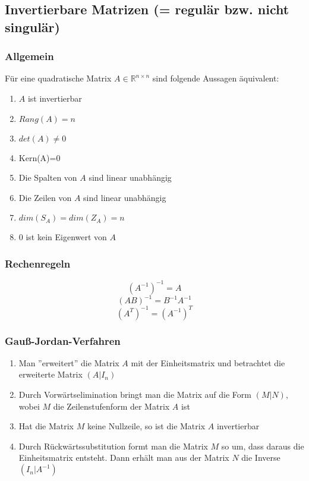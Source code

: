 \documentclass[a4paper,twocolumn,10pt]{article}
\begin{document}
\subsection{Invertierbare Matrizen (= regulär bzw. nicht singulär)}

\subsubsection{Allgemein}
Für eine quadratische Matrix $A\in\mathbb{R}^{n\times n}$ sind folgende Aussagen äquivalent:
\begin{enumerate}
\item $A$ ist invertierbar
\item $Rang(A)=n$
\item $det(A)\neq 0$
\item Kern(A)={0}
\item Die Spalten von $A$ sind linear unabhängig
\item Die Zeilen von $A$ sind linear unabhängig
\item $dim(S_A)=dim(Z_A)=n$
\item $0$ ist kein Eigenwert von $A$

\end{enumerate}

\subsubsection{Rechenregeln}
\begin{equation*}
(A^{-1})^{-1}=A
\end{equation*}
\begin{equation*}
(AB)^{-1}=B^{-1}A^{-1}
\end{equation*}
\begin{equation*}
(A^T)^{-1}=(A^{-1})^T
\end{equation*}

\subsubsection{Gauß-Jordan-Verfahren}
\begin{enumerate}
\item Man ''erweitert'' die Matrix $A$ mit der Einheitsmatrix und betrachtet die erweiterte Matrix $(A|I_n)$
\item Durch Vorwärtselimination bringt man die Matrix auf die Form $(M|N)$, wobei $M$ die Zeilenstufenform der Matrix $A$ ist
\item Hat die Matrix $M$ keine Nullzeile, so ist die Matrix $A$ invertierbar
\item Durch Rückwärtssubstitution formt man die Matrix $M$ so um, dass daraus die Einheitsmatrix entsteht. Dann erhält man aus der Matrix $N$ die Inverse $(I_n|A^{-1})$
\end{enumerate}
\end{document}
